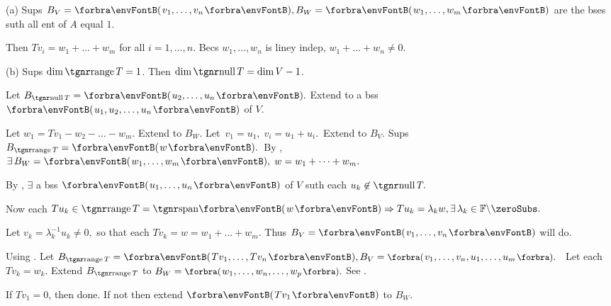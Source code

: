 \par\quad
(a) Sups $B_V=\Par{v_1,\dots,v_n},B_W=\Par{w_1,\dots,w_m}$ are the bses suth all ent of $A$ equal $1$.\par\quad\Ha
Then $Tv_i=w_1+\dots+w_m$ for all $i=1,\dots,n$. Becs $w_1,\dots,w_n$ is liney indep, $w_1+\dots+w_n\neq 0.$\vspace{4pt}\par\quad
(b) Sups $\dim\range T=1$. Then $\dim\null T=\dim V-1$.\par\quad\Hb
Let $B_{\null T}=\Par{u_2,\dots,u_n}.$ Extend to a bss $\Par{u_1,u_2,\dots,u_n}$ of $V.$\par\quad\Hb
Let $w_1=Tv_1-w_2-\dots-w_m.$ Extend to $B_W.$ \;Let \,$v_1=u_1,\;v_i=u_1+u_i.$ \,Extend to $B_V.$\PfEnd\vspace{6pt}\quad\Hb
\Or Sups $B_{\range T}=\Par{w}.$ \,By , $\exists\,B_W=\Par{w_1,\dots,w_m},\;w=w_1+\dots+w_m.$\par\quad\Hb
By , $\exists$ a bss $\Par{u_1,\dots,u_n}$ of $V$ suth each $u_k\not\in\null T.$\par\quad\Hb
Now each $Tu_k\in\range T=\Span{w}\Rightarrow Tu_k=\lambda_k w,\exists\,\lambda_k\in\nonzeroFbb.$\par\quad\Hb
Let $v_k=\lambda_k^{-1}u_k\neq 0,$ so that each $Tv_k=w=w_1+\dots+w_m.$ Thus $B_V=\Par{v_1,\dots,v_n}$ will do.\PfEnd
\SepLine\pagebreak

Using . Let $B_{\range T}=\Par{Tv_1,\dots,Tv_n},B_V=\BigPar{v_1,\dots,v_n,u_1,\dots,u_m}.$\PfEnd\vspace{2pt}
\Comment \,\,\,Let each $Tv_k=w_k.$ Extend $B_{\range T}$ to $B_W=\BigPar{w_1,\dots,w_n,\dots,w_p}.$ See .
\SepLine

If $Tv_1=0$, then done. If not then extend $\Par{Tv_1}$ to $B_W.$\PfEnd
\SepLine

